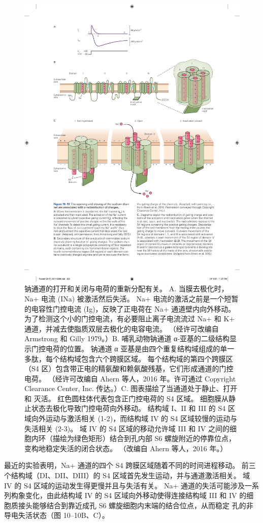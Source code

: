 \begin{figure}[htbp]
	\centering
	\includegraphics[width=0.8\linewidth]{chap10/fig_10_10}
	\caption{钠通道的打开和关闭与电荷的重新分配有关。 A. 当膜去极化时，Na+ 电流 (INa) 被激活然后失活。 Na+ 电流的激活之前是一个短暂的电容性门控电流 (Ig)，反映了正电荷在 Na+ 通道壁内向外移动。 为了检测这个小的门控电流，有必要阻止离子电流流过 Na+ 和 K+ 通道，并减去使脂质双层去极化的电容电流。 （经许可改编自 Armstrong 和 Gilly 1979。）B. 哺乳动物钠通道 α-亚基的二级结构显示门控电荷的位置。 钠通道 α 亚基是由四个重复结构域组成的单一多肽，每个结构域包含六个跨膜区域。 每个结构域的第四个跨膜区（S4 区）包含带正电的精氨酸和赖氨酸残基，它们形成通道的门控电荷。 （经许可改编自 Ahern 等人，2016 年。许可通过 Copyright Clearance Center, Inc. 传达。）C. 图表描绘了当通道处于静止、打开和 灭活。 红色圆柱体代表包含正门控电荷的 S4 区域。 细胞膜从静止状态去极化导致门控电荷向外移动。 结构域 I、II 和 III 的 S4 区域向外运动与激活相关 (1-2)，而结构域 IV 的 S4 区域较慢的运动与失活相关 (2-3)。 域 IV 的 S4 区域的移动允许域 III 和 IV 之间的细胞内环（描绘为绿色矩形）结合到孔内部 S6 螺旋附近的停靠位点，变构地稳定失活的闭合状态。 （改编自 Ahern 等人，2016 年。）}
	\label{fig:10_10}
\end{figure}



最近的实验表明，Na+ 通道的四个 S4 跨膜区域随着不同的时间进程移动。 
前三个结构域（DI、DII、DIII）的 S4 区域首先发生运动，并与通道激活相关。 
域 IV 的 S4 区域的运动发生得更慢并且与失活有关。 
Na+ 通道的失活可能涉及一系列构象变化，由此结构域 IV 的 S4 区域向外移动使得连接结构域 III 和 IV 的细胞质接头能够结合到靠近成孔 S6 螺旋细胞内末端的结合位点，从而稳定 孔的非导电失活状态（图 10–10B、C）。


